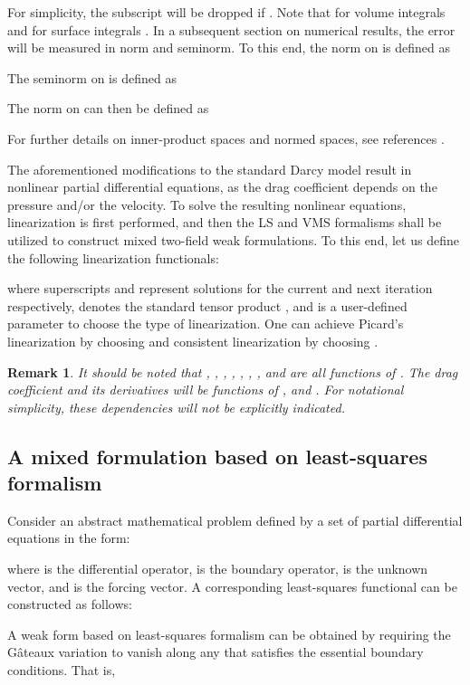 \documentclass[11pt,reqno]{amsart}
\newtheorem{remark}[theorem]{Remark}
\begin{document}
For simplicity, the subscript  will be dropped 
if . Note that for volume integrals 
 and for surface integrals 
. In a subsequent 
section on numerical results, the error will be 
measured in  norm and  seminorm. To 
this end, the  norm on  is defined 
as 

The  seminorm on  is defined as

The  norm on  can then be defined as 

For further details on inner-product spaces and normed 
spaces, see references \cite{Reddy_Functional_Analysis,
Oden_Demkowicz}.

The aforementioned modifications to the standard 
Darcy model result in nonlinear partial differential 
equations, as the drag coefficient depends on the 
pressure and/or the velocity. To solve the resulting 
nonlinear equations, linearization is first performed, 
and then the LS and VMS formalisms shall be utilized 
to construct mixed two-field weak formulations. 
To this end, let us define the following linearization 
functionals:

where superscripts  and  represent 
solutions for the current and next iteration 
respectively,  denotes the standard 
tensor product \cite{Chadwick}, and  is a user-defined parameter to 
choose the type of linearization. One can 
achieve Picard's linearization by choosing 
 and consistent linearization 
by choosing .
\begin{remark}
  It should be noted that , , , 
  , , , , and  
  are all functions of . The drag coefficient 
  and its derivatives will be functions of , 
   and . For notational 
  simplicity, these dependencies will not be explicitly 
  indicated. 
\end{remark}

\subsection{A mixed formulation based on least-squares formalism}
Consider an abstract mathematical problem 
defined by a set of partial differential 
equations in the form:

where  is the differential operator, 
 is the boundary operator,  
is the unknown vector, and  is the 
forcing vector. A corresponding least-squares 
functional can be constructed as follows:

A weak form based on least-squares formalism can 
be obtained by requiring the G\^{a}teaux variation 
to vanish along any  that satisfies 
the essential boundary conditions. That is,
\end{document}
